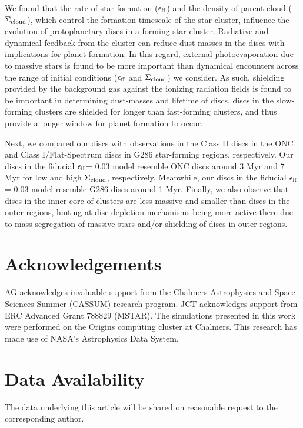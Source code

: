 \documentclass[fleqn,usenatbib]{mnras}
\newcommand\sfeff{\ensuremath{\epsilon_{\rm ff}}\xspace}   %
\newcommand\Sigmacloud{\ensuremath{\Sigma_{\rm cloud}}\xspace} %
\begin{document}
We found that the rate of star formation (\sfeff) and the density of parent cloud (\Sigmacloud), which control the formation timescale of the star cluster, influence the evolution of protoplanetary discs in a forming star cluster. Radiative and dynamical feedback from the cluster can reduce dust masses in the discs with implications for planet formation. In this regard, external photoevaporation due to massive stars is found to be more important than dynamical encounters across the range of initial conditions (\sfeff and \Sigmacloud) we consider. As such, shielding provided by the background gas against the ionizing radiation fields is found to be important in determining dust-masses and lifetime of discs. discs in the slow-forming clusters are shielded for longer than fast-forming clusters, and thus provide a longer window for planet formation to occur. 

Next, we compared our discs with observations in the Class II discs in the ONC and Class I/Flat-Spectrum discs in G286 star-forming regions, respectively. Our discs in the fiducial \sfeff = 0.03 model resemble ONC discs around 3 Myr and 7 Myr for low and high \Sigmacloud, respectively. Meanwhile, our discs in the fiducial \sfeff = 0.03 model resemble G286 discs around 1 Myr. Finally, we also observe that discs in the inner core of clusters are less massive and smaller than discs in the outer regions, hinting at disc depletion mechanisms being more active there due to mass segregation of massive stars and/or shielding of discs in outer regions. 

\section*{Acknowledgements}
AG acknowledges invaluable support from the Chalmers Astrophysics and Space Sciences Summer (CASSUM) research program. JCT acknowledges support from ERC Advanced Grant 788829 (MSTAR). The simulations presented in this work were performed on the Origins computing cluster at Chalmers. This research has made use of NASA’s Astrophysics Data System.  

\section*{Data Availability}
The data underlying this article will be shared on reasonable request to the corresponding author.

\end{document}

